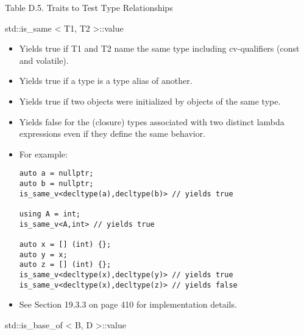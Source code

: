 \begin{center}
Table D.5. Traits to Test Type Relationships
\end{center}

std::is\_same < T1, T2 >::value

\begin{itemize}
\item
Yields true if T1 and T2 name the same type including cv-qualifiers (const and volatile).

\item
Yields true if a type is a type alias of another.

\item
Yields true if two objects were initialized by objects of the same type.

\item
Yields false for the (closure) types associated with two distinct lambda expressions even if they define the same behavior.

\item
For example:
\begin{lstlisting}[style=styleCXX]
auto a = nullptr;
auto b = nullptr;
is_same_v<decltype(a),decltype(b)> // yields true

using A = int;
is_same_v<A,int> // yields true

auto x = [] (int) {};
auto y = x;
auto z = [] (int) {};
is_same_v<decltype(x),decltype(y)> // yields true
is_same_v<decltype(x),decltype(z)> // yields false
\end{lstlisting}

\item
See Section 19.3.3 on page 410 for implementation details.
\end{itemize}

std::is\_base\_of < B, D >::value


